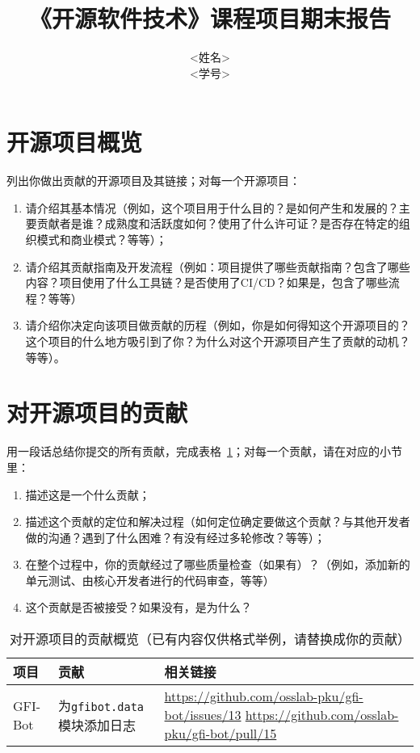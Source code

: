 \documentclass[lang=cn,11pt,a4paper,cite=authoryear]{elegantpaper}
\title{《开源软件技术》课程项目期末报告}
\author{
<姓名>\\<学号>\\\email{xxxxx@pku.edu.cn}
}
\date{}
\begin{document}
\maketitle

\section{开源项目概览}

\begin{tcolorbox}[title=\textbf{请在这一节包含如下内容：},colback=yellow!10!white]
  列出你做出贡献的开源项目及其链接；对每一个开源项目：
  \begin{enumerate}
    \item 请介绍其基本情况（例如，这个项目用于什么目的？是如何产生和发展的？主要贡献者是谁？成熟度和活跃度如何？使用了什么许可证？是否存在特定的组织模式和商业模式？等等）；
    \item 请介绍其贡献指南及开发流程（例如：项目提供了哪些贡献指南？包含了哪些内容？项目使用了什么工具链？是否使用了CI/CD？如果是，包含了哪些流程？等等）
    \item 请介绍你决定向该项目做贡献的历程（例如，你是如何得知这个开源项目的？这个项目的什么地方吸引到了你？为什么对这个开源项目产生了贡献的动机？等等）。
  \end{enumerate}
\end{tcolorbox}

\section{对开源项目的贡献}

\begin{tcolorbox}[title=\textbf{请在这一节包含如下内容：},colback=yellow!10!white]
用一段话总结你提交的所有贡献，完成表格~\ref{tab:contrib}；对每一个贡献，请在对应的小节里：
\begin{enumerate}
    \item 描述这是一个什么贡献；
    \item 描述这个贡献的定位和解决过程（如何定位确定要做这个贡献？与其他开发者做的沟通？遇到了什么困难？有没有经过多轮修改？等等）；
    \item 在整个过程中，你的贡献经过了哪些质量检查（如果有）？（例如，添加新的单元测试、由核心开发者进行的代码审查，等等）
    \item 这个贡献是否被接受？如果没有，是为什么？
\end{enumerate}
\end{tcolorbox}

\begin{table}[]
    \centering
    \caption{对开源项目的贡献概览（已有内容仅供格式举例，请替换成你的贡献）}
    \begin{tabular}{llp{9cm}}
      \toprule
        项目 & 贡献 & 相关链接 \\
      \midrule
        GFI-Bot & 为\texttt{gfibot.data}模块添加日志 & \url{https://github.com/osslab-pku/gfi-bot/issues/13} \newline \url{https://github.com/osslab-pku/gfi-bot/pull/15}\\ 
      \bottomrule
    \end{tabular}
    \label{tab:contrib}
\end{table}
\end{document}
